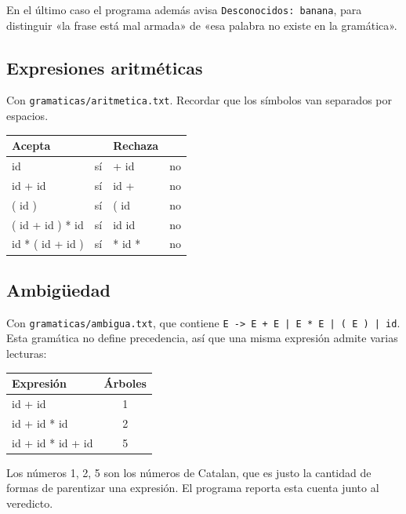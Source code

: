 \documentclass[11pt,a4paper]{article}
\newcommand{\gram}[1]{\texttt{#1}}
\begin{document}
En el último caso el programa además avisa \texttt{Desconocidos: banana}, para
distinguir «la frase está mal armada» de «esa palabra no existe en la
gramática».

\subsection{Expresiones aritméticas}

Con \texttt{gramaticas/aritmetica.txt}. Recordar que los símbolos van
separados por espacios.

\begin{center}
\begin{tabular}{@{}>{\ttfamily}l c >{\ttfamily}l c@{}}
\toprule
\textrm{\textbf{Acepta}} & & \textrm{\textbf{Rechaza}} & \\
\midrule
id                  & sí & + id     & no \\
id + id             & sí & id +     & no \\
( id )              & sí & ( id     & no \\
( id + id ) * id    & sí & id id    & no \\
id * ( id + id )    & sí & * id *   & no \\
\bottomrule
\end{tabular}
\end{center}

\subsection{Ambigüedad}

Con \texttt{gramaticas/ambigua.txt}, que contiene
\gram{E -> E + E | E * E | ( E ) | id}. Esta gramática no define precedencia,
así que una misma expresión admite varias lecturas:

\begin{center}
\begin{tabular}{@{}>{\ttfamily}l c@{}}
\toprule
\textrm{\textbf{Expresión}} & \textbf{Árboles} \\
\midrule
id + id             & 1 \\
id + id * id        & 2 \\
id + id * id + id   & 5 \\
\bottomrule
\end{tabular}
\end{center}

Los números 1, 2, 5 son los números de Catalan, que es justo la cantidad de
formas de parentizar una expresión. El programa reporta esta cuenta junto al
veredicto.
\end{document}
